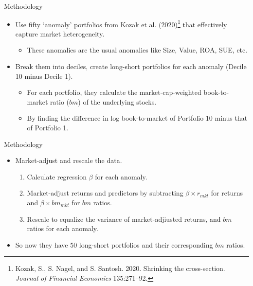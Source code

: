 \documentclass[dvipsnames,mathserif, handout]{beamer}
\begin{document}
{\begin{frame}{Methodology}
	\begin{itemize}
		\item Use fifty `anomaly' portfolios from Kozak et al. (2020)\footnote{\tiny Kozak, S., S. Nagel, and S. Santosh. 2020. Shrinking the cross-section. \textit{Journal of Financial Economics} 135:271–92.} that effectively capture market heterogeneity.
		\begin{itemize}
			\item These anomalies are the usual anomalies like Size, Value, ROA, SUE, etc.
		\end{itemize}
		\item Break them into deciles, create long-short portfolios for each anomaly (Decile 10 minus Decile 1).
		\begin{itemize}
			\item For each portfolio, they calculate the market-cap-weighted book-to-market ratio ($bm$) of the underlying stocks.
			\item By finding the difference in log book-to-market of Portfolio 10 minus that of Portfolio 1.
		\end{itemize}
	\end{itemize}
\end{frame}

\begin{frame}{Methodology}
	\begin{itemize}
		\item Market-adjust and rescale the data. 
		\begin{enumerate}
			\item Calculate regression $\beta$ for each anomaly. 
			\item Market-adjust returns and predictors by subtracting $\beta \times r_{mkt}$ for returns and $\beta \times bm_{mkt}$ for $bm$ ratios.
			\item Rescale to equalize the variance of market-adjiusted returns, and $bm$ ratios for each anomaly.
		\end{enumerate}
		\item So now they have 50 long-short portfolios and their corresponding $bm$ ratios.
	\end{itemize}
\end{frame}

}
\end{document}
